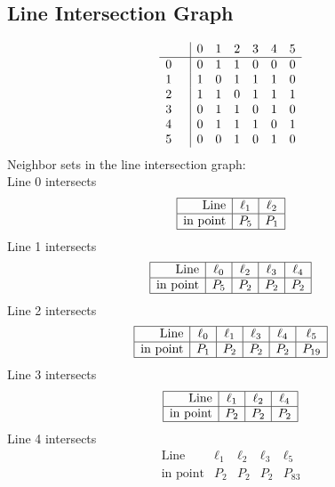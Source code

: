 \documentclass{article}
\begin{document}
{\subsection*{Line Intersection Graph}
{\arraycolsep=1pt
$$
\begin{array}{rr|*{6}r}
 &  & 0 & 1 & 2 & 3 & 4 & 5\\
\hline
0 &  & 0 & 1 & 1 & 0 & 0 & 0\\
1 &  & 1 & 0 & 1 & 1 & 1 & 0\\
2 &  & 1 & 1 & 0 & 1 & 1 & 1\\
3 &  & 0 & 1 & 1 & 0 & 1 & 0\\
4 &  & 0 & 1 & 1 & 1 & 0 & 1\\
5 &  & 0 & 0 & 1 & 0 & 1 & 0\\
\end{array}
$$
}%
Neighbor sets in the line intersection graph:\\
Line 0 intersects 
$$
\begin{array}{|r*{2}{|c}|}
\hline
\mbox{Line}  & \ell_{1} & \ell_{2}\\
\hline
\mbox{in point}  & P_{5} & P_{1}\\
\hline
\end{array}
$$
Line 1 intersects 
$$
\begin{array}{|r*{4}{|c}|}
\hline
\mbox{Line}  & \ell_{0} & \ell_{2} & \ell_{3} & \ell_{4}\\
\hline
\mbox{in point}  & P_{5} & P_{2} & P_{2} & P_{2}\\
\hline
\end{array}
$$
Line 2 intersects 
$$
\begin{array}{|r*{5}{|c}|}
\hline
\mbox{Line}  & \ell_{0} & \ell_{1} & \ell_{3} & \ell_{4} & \ell_{5}\\
\hline
\mbox{in point}  & P_{1} & P_{2} & P_{2} & P_{2} & P_{19}\\
\hline
\end{array}
$$
Line 3 intersects 
$$
\begin{array}{|r*{3}{|c}|}
\hline
\mbox{Line}  & \ell_{1} & \ell_{2} & \ell_{4}\\
\hline
\mbox{in point}  & P_{2} & P_{2} & P_{2}\\
\hline
\end{array}
$$
Line 4 intersects 
$$
\begin{array}{|r*{4}{|c}|}
\hline
\mbox{Line}  & \ell_{1} & \ell_{2} & \ell_{3} & \ell_{5}\\
\hline
\mbox{in point}  & P_{2} & P_{2} & P_{2} & P_{83}\\

\end{array}$$}
\end{document}
